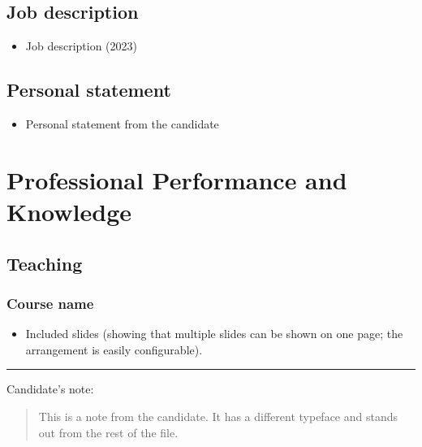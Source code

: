 \documentclass[12pt,oneside]{book}
\newcommand{\candidatenote}[1] {%
\par\noindent\rule{\textwidth}{1pt}
{\large Candidate's note:}
\begin{quote}
  \fontfamily{phv}\selectfont
  {\small #1}
\end{quote}
}
\begin{document}


\section{Job description}

\begin{itemize}
  \item Job description (2023)
\end{itemize}



\section{Personal statement}

\begin{itemize}
  \item Personal statement from the candidate
\end{itemize}



\renewcommand\thechapter{A}
\chapter{Professional Performance and Knowledge}

\section{Teaching}

\subsection{Course name}

\begin{itemize}
  \item Included slides (showing that multiple slides can be shown on one page; the arrangement is easily configurable).
\end{itemize}

\candidatenote{
  This is a note from the candidate.  It has a different typeface and stands out from the rest of the file.
}

\end{document}
